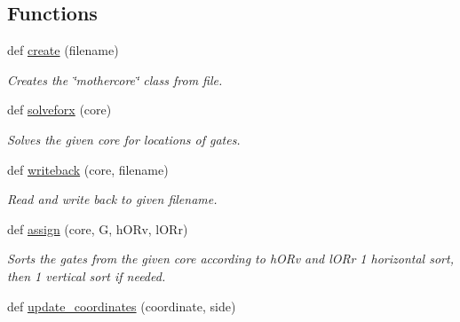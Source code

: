 \subsection*{Functions}
\begin{DoxyCompactItemize}
\item 
def \hyperlink{namespacegqp__placer_a79e959958df02edd23d005c3bd39f76b}{create} (filename)\hypertarget{namespacegqp__placer_a79e959958df02edd23d005c3bd39f76b}{}\label{namespacegqp__placer_a79e959958df02edd23d005c3bd39f76b}

\begin{DoxyCompactList}\small\item\em Creates the \char`\"{}mothercore\char`\"{} class from file. \end{DoxyCompactList}\item 
def \hyperlink{namespacegqp__placer_af9c1a6e7a029032bede284565d4052a0}{solveforx} (core)\hypertarget{namespacegqp__placer_af9c1a6e7a029032bede284565d4052a0}{}\label{namespacegqp__placer_af9c1a6e7a029032bede284565d4052a0}

\begin{DoxyCompactList}\small\item\em Solves the given core for locations of gates. \end{DoxyCompactList}\item 
def \hyperlink{namespacegqp__placer_ac0e10aaeefffce8ac622fa07b37709e6}{writeback} (core, filename)\hypertarget{namespacegqp__placer_ac0e10aaeefffce8ac622fa07b37709e6}{}\label{namespacegqp__placer_ac0e10aaeefffce8ac622fa07b37709e6}

\begin{DoxyCompactList}\small\item\em Read and write back to given filename. \end{DoxyCompactList}\item 
def \hyperlink{namespacegqp__placer_adc1081e9e8526fb4db8748388be1ada5}{assign} (core, G, h\+O\+Rv, l\+O\+Rr)\hypertarget{namespacegqp__placer_adc1081e9e8526fb4db8748388be1ada5}{}\label{namespacegqp__placer_adc1081e9e8526fb4db8748388be1ada5}

\begin{DoxyCompactList}\small\item\em Sorts the gates from the given core according to h\+O\+Rv and l\+O\+Rr 1 horizontal sort, then 1 vertical sort if needed. \end{DoxyCompactList}\item 
def \hyperlink{namespacegqp__placer_a56ef0cdc6c1625b0e9bc0a4ab97d763c}{update\+\_\+coordinates} (coordinate, side)\hypertarget{namespacegqp__placer_a56ef0cdc6c1625b0e9bc0a4ab97d763c}{}\label{namespacegqp__placer_a56ef0cdc6c1625b0e9bc0a4ab97d763c}


\end{DoxyCompactItemize}
